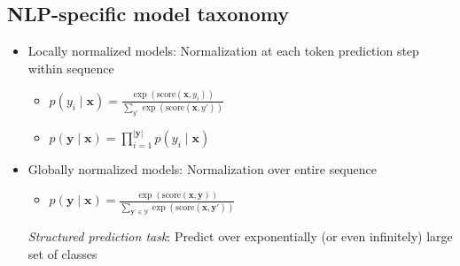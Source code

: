 \subsection*{NLP-specific model taxonomy}
\begin{itemize}
    \item Locally normalized models: Normalization at each token prediction step within sequence
    \begin{itemize}
        \item $p(y_i \mid \mathbf{x}) = \frac{\exp(\text{score}(\mathbf{x}, y_i))}{\sum_{y'} \exp(\text{score}(\mathbf{x}, y'))}$
        \item $p(\mathbf{y} \mid \mathbf{x}) = \prod_{i=1}^{|\mathbf{y}|} p(y_i \mid \mathbf{x})$
    \end{itemize}
    \item Globally normalized models: Normalization over entire sequence
    \begin{itemize}
        \item $p(\mathbf{y} \mid \mathbf{x}) = \frac{\exp(\text{score}(\mathbf{x}, \mathbf{y}))}{\sum_{\mathbf{y}' \in \mathcal{Y}} \exp(\text{score}(\mathbf{x}, \mathbf{y}'))}$
    \end{itemize}
    \emph{Structured prediction task}: Predict over exponentially (or even infinitely) large set of classes
\end{itemize}